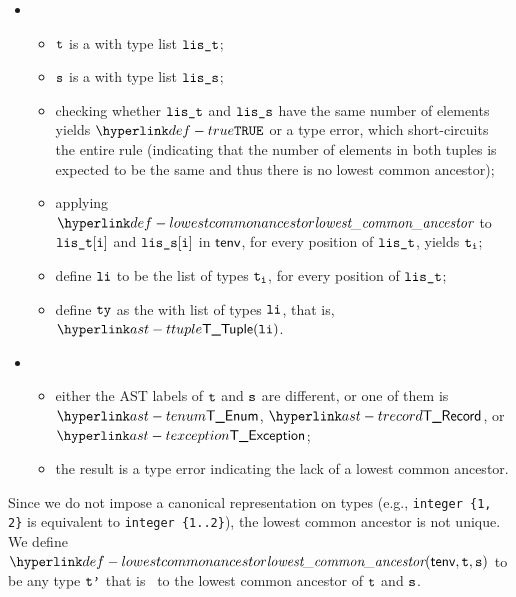 \begin{itemize}
\begin{itemize}
\begin{itemize}
      \item {}
      \begin{itemize}
        \item $\vt$ is a \tupletypeterm{} with type list $\vlit$;
        \item $\vs$ is a \tupletypeterm{} with type list $\vlis$;
        \item checking whether $\vlit$ and $\vlis$ have the same number of elements yields $\True$
              or a type error, which short-circuits the entire rule (indicating that the number of elements in both tuples is expected
              to be the same and thus there is no lowest common ancestor);
        \item applying $\lca$ to $\vlit[\vi]$ and $\vlis[\vi]$ in $\tenv$, for every position of $\vlit$,
              yields $\vt_\vi$\ProseOrTypeError;
        \item define $\vli$ to be the list of types $\vt_\vi$, for every position of $\vlit$;
        \item define $\tty$ as the \tupletypeterm{} with list of types $\vli$, that is, $\TTuple(\vli)$.
      \end{itemize}

      \item {}
      \begin{itemize}
        \item either the AST labels of $\vt$ and $\vs$ are different, or one of them is $\TEnum$, $\TRecord$, or $\TException$;
        \item the result is a type error indicating the lack of a lowest common ancestor.
      \end{itemize}
    \end{itemize}
  \end{itemize}
\end{itemize}

\FormallyParagraph
Since we do not impose a canonical representation on types (e.g., \verb|integer {1, 2}| is equivalent to \verb|integer {1..2}|),
the lowest common ancestor is not unique.
We define $\lca(\tenv, \vt, \vs)$ to be any type $\vtp$ that is \typeequivalent\ to the lowest common ancestor of $\vt$ and $\vs$.

\begin{mathpar}
\end{mathpar}

